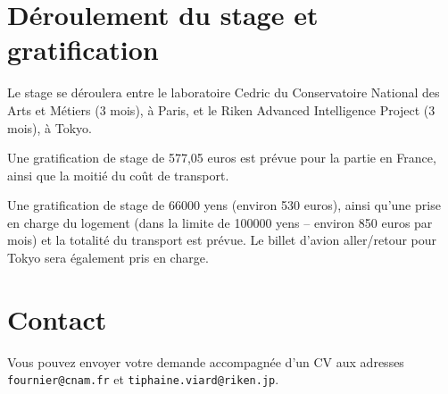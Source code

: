 \documentclass[a4paper, 12pt]{article}
\begin{document}
\section{Déroulement du stage et gratification}

Le stage se déroulera entre le laboratoire Cedric du Conservatoire National des Arts et Métiers (3 mois), à Paris, et le Riken Advanced Intelligence Project (3 mois), à Tokyo.

Une gratification de stage de 577,05 euros est prévue pour la partie en France, ainsi que la moitié du coût de transport.

Une gratification de stage de 66000 yens (environ 530 euros), ainsi qu'une prise en charge du logement (dans la limite de 100000 yens -- environ 850 euros par mois) et la totalité du transport est prévue. Le billet d'avion aller/retour pour Tokyo sera également pris en charge.

\section{Contact}

Vous pouvez envoyer votre demande accompagnée d'un CV aux adresses \texttt{fournier@cnam.fr} et \texttt{tiphaine.viard@riken.jp}.




\end{document}
